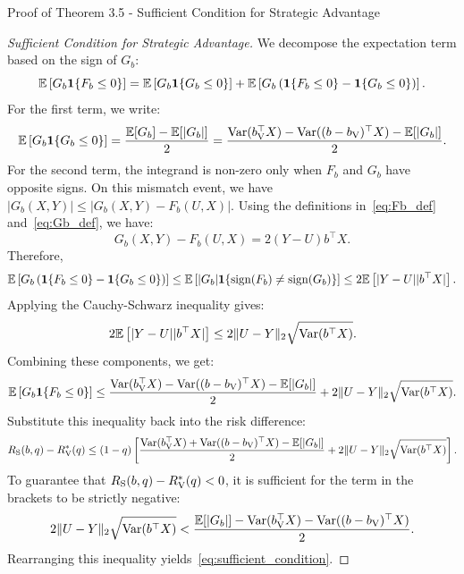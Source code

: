 \begin{sourceblock}{Proof of Theorem 3.5 - Sufficient Condition for Strategic Advantage}
\begin{proof}[Sufficient Condition for Strategic Advantage]
We decompose the expectation term based on the sign of $G_b$:
\begin{equation}
    \mathbb{E}\left[ G_b \mathbf{1}\{F_b \le 0\} \right] = \mathbb{E}\left[ G_b \mathbf{1}\{G_b \le 0\} \right] + \mathbb{E}\left[ G_b \left( \mathbf{1}\{F_b \le 0\} - \mathbf{1}\{G_b \le 0\} \right) \right].
\end{equation}
For the first term, we write:
\begin{equation}
    \mathbb{E}\left[ G_b \mathbf{1}\{G_b \le 0\} \right] = \frac{\mathbb{E}[G_b] - \mathbb{E}[|G_b|]}{2} = \frac{\mathrm{Var}(b_{\mathrm{V}}^\top X) - \mathrm{Var}((b - b_{\mathrm{V}})^\top X) - \mathbb{E}[|G_b|]}{2}.
\end{equation}
For the second term, the integrand is non-zero only when $F_b$ and $G_b$ have opposite signs. On this mismatch event, we have $|G_b(X, Y)| \le |G_b(X, Y) - F_b(U, X)|$. 
Using the definitions in~\eqref{eq:Fb_def} and~\eqref{eq:Gb_def}, we have:
\begin{equation}
    G_b(X, Y) - F_b(U, X) = 2(Y - U)b^\top X.
\end{equation}
Therefore,
\begin{equation}
    \mathbb{E}\left[ G_b \left( \mathbf{1}\{F_b \le 0\} - \mathbf{1}\{G_b \le 0\} \right) \right] \le \mathbb{E}\left[ |G_b| \mathbf{1}\{\mathrm{sign}(F_b) \ne \mathrm{sign}(G_b)\} \right] \le 2\mathbb{E}\left[ |Y - U||b^\top X| \right].
\end{equation}
Applying the Cauchy-Schwarz inequality gives:
\begin{equation}
    2\mathbb{E}\left[ |Y - U||b^\top X| \right] \le 2 \|U - Y\|_2 \sqrt{\mathrm{Var}(b^\top X)}.
\end{equation}
Combining these components, we get:
\begin{equation}
    \mathbb{E}\left[ G_b \mathbf{1}\{F_b \le 0\} \right] \le \frac{\mathrm{Var}(b_{\mathrm{V}}^\top X) - \mathrm{Var}((b - b_{\mathrm{V}})^\top X) - \mathbb{E}[|G_b|]}{2} + 2 \|U - Y\|_2 \sqrt{\mathrm{Var}(b^\top X)}.
\end{equation}
Substitute this inequality back into the risk difference:
\begin{equation}
    R_{\mathrm{S}}(b, q) - R_{\mathrm{V}}^*(q) \le (1 - q) \left[ \frac{\mathrm{Var}(b_{\mathrm{V}}^\top X) + \mathrm{Var}((b - b_{\mathrm{V}})^\top X) - \mathbb{E}[|G_b|]}{2} + 2\|U - Y\|_2 \sqrt{\mathrm{Var}(b^\top X)} \right].
\end{equation}
To guarantee that $R_{\mathrm{S}}(b, q) - R_{\mathrm{V}}^*(q) < 0$, it is sufficient for the term in the brackets to be strictly negative:
\begin{equation}
    2\|U - Y\|_2 \sqrt{\mathrm{Var}(b^\top X)} < \frac{\mathbb{E}[|G_b|] - \mathrm{Var}(b_{\mathrm{V}}^\top X) - \mathrm{Var}((b - b_{\mathrm{V}})^\top X)}{2}.
\end{equation}
Rearranging this inequality yields~\eqref{eq:sufficient_condition}.
\end{proof}
\end{sourceblock}

